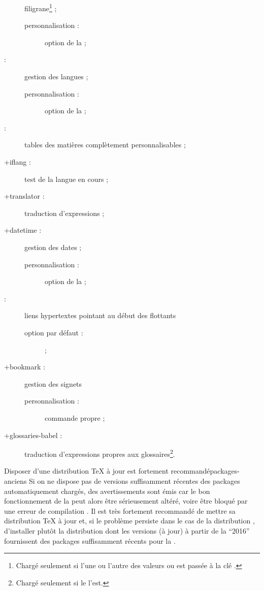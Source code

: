 \begin{description}
  filigrane\footnote{Chargé seulement si l'une ou l'autre des
    valeurs  ou  est passée à la clé
    .} ;
  \begin{description}
  \item[personnalisation :] option  de la \yatCl ;
  \end{description}
\item[\package{babel} :] gestion des langues ;
  \begin{description}
  \item[personnalisation :] option  de la \yatCl ;
  \end{description}
\item[\package{etoc} :] tables des matières complètement personnalisables ;
\item[\package*+{iflang} :] test de la langue en cours ;
\item[\package*+{translator} :] traduction d'expressions ;
\item[\package+{datetime} :] gestion des dates ;
  \begin{description}
  \item[personnalisation :] option  de la \yatCl ;
  \end{description}
\item[\package{hypcap} :] liens hypertextes pointant au début des
  flottants%
  \begin{description}
  \item[option par défaut :]  ;
  \end{description}
\item[\package+{bookmark} :] gestion des signets%
  \begin{description}
  \item[personnalisation :] commande propre  ;
  \end{description}
\item[\package*+{glossaries-babel} :] traduction d'expressions propres aux
  glossaires\footnote{Chargé seulement si le  l'est.}.
\end{description}

\begin{dbremark}{Disposer d'une distribution \TeX{} à jour est fortement
    recommandé}{packages-anciens}
  Si on ne dispose pas de versions suffisamment récentes des packages
  automatiquement chargés, des avertissements sont émis car le bon
  fonctionnement de la \yatCl{} peut alors être sérieusement altéré, voire être
  bloqué par une erreur de compilation . Il
  est très fortement recommandé de mettre sa distribution \TeX{} à jour et, si
  le problème persiste dans le cas de la distribution \miktex{},
  d'installer plutôt la distribution \texlive dont les versions (à
  jour) à partir de la \enquote{2016} fournissent des packages suffisamment
  récents pour la \yatCl.
\end{dbremark}

